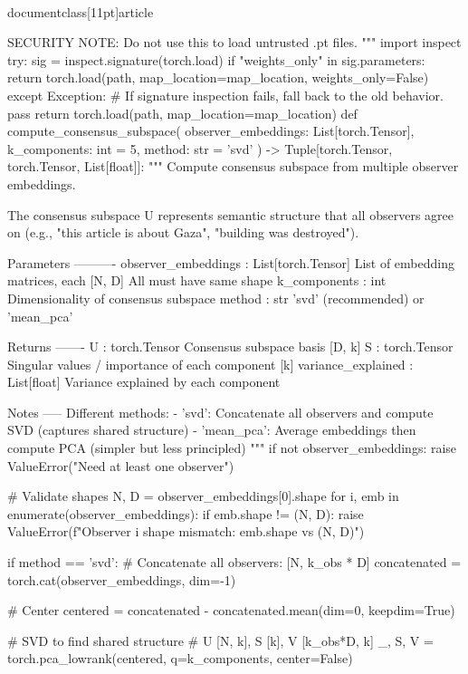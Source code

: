 \\documentclass[11pt]{article}
\begin{document}
\begin{CodeBlock}
    SECURITY NOTE: Do not use this to load untrusted .pt files.
    """
    import inspect
    try:
        sig = inspect.signature(torch.load)
        if "weights_only" in sig.parameters:
            return torch.load(path, map_location=map_location, weights_only=False)
    except Exception:
        # If signature inspection fails, fall back to the old behavior.
        pass
    return torch.load(path, map_location=map_location)
def compute_consensus_subspace(
    observer_embeddings: List[torch.Tensor],
    k_components: int = 5,
    method: str = 'svd'
) -> Tuple[torch.Tensor, torch.Tensor, List[float]]:
    """
    Compute consensus subspace from multiple observer embeddings.
    
    The consensus subspace U represents semantic structure that all observers
    agree on (e.g., "this article is about Gaza", "building was destroyed").
    
    Parameters
    ----------
    observer_embeddings : List[torch.Tensor]
        List of embedding matrices, each [N, D]
        All must have same shape
    k_components : int
        Dimensionality of consensus subspace
    method : str
        'svd' (recommended) or 'mean_pca'
    
    Returns
    -------
    U : torch.Tensor
        Consensus subspace basis [D, k]
    S : torch.Tensor
        Singular values / importance of each component [k]
    variance_explained : List[float]
        Variance explained by each component
    
    Notes
    -----
    Different methods:
    - 'svd': Concatenate all observers and compute SVD (captures shared structure)
    - 'mean_pca': Average embeddings then compute PCA (simpler but less principled)
    """
    if not observer_embeddings:
        raise ValueError("Need at least one observer")
    
    # Validate shapes
    N, D = observer_embeddings[0].shape
    for i, emb in enumerate(observer_embeddings):
        if emb.shape != (N, D):
            raise ValueError(f"Observer {i} shape mismatch: {emb.shape} vs {(N, D)}")
    
    if method == 'svd':
        # Concatenate all observers: [N, k_obs * D]
        concatenated = torch.cat(observer_embeddings, dim=-1)
        
        # Center
        centered = concatenated - concatenated.mean(dim=0, keepdim=True)
        
        # SVD to find shared structure
        # U [N, k], S [k], V [k_obs*D, k]
        _, S, V = torch.pca_lowrank(centered, q=k_components, center=False)
        

\end{CodeBlock}
\end{document}
